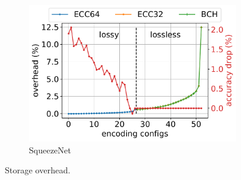 \documentclass{article}
\begin{document}
\begin{figure}
\begin{subfigure}{.3\textwidth}
		\includegraphics[width=\textwidth]{NeuRIPS2019/images/overhead/squeezenet_int8_overhead.pdf}
		\caption{SqueezeNet}
	\end{subfigure}
	\caption{Storage overhead.}
	\label{fig:overhead}
\end{figure}
\end{document}

